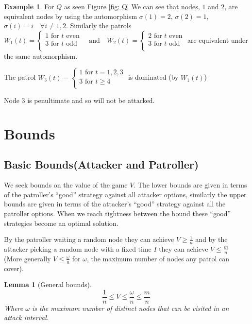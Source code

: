 \documentclass[a4paper,10pt]{article}
\newtheorem{lemma}[theorem]{Lemma}
\theoremstyle{definition}
\theoremstyle{definition}
\newtheorem{example}[theorem]{Example}
\theoremstyle{remark}
\theoremstyle{definition}
\begin{document}
\begin{example}
For $Q$ as seen Figure \ref{fig: Q} We can see that nodes, $1$ and $2$, are equivalent nodes by using the automorphism $\sigma(1)=2$, $\sigma(2)=1$, $\sigma(i)=i \quad \forall i \neq 1,2$. Similarly the patrols ${W_{1}(t)=\left\{\begin{array}{l}
1 \text{ for } t \text{ even} \\
3 \text{ for } t \text{ odd} \\  
\end{array}\right.} \quad \text{and} \quad {W_{2}(t)=\left\{\begin{array}{l}
2 \text{ for } t \text{ even} \\
3 \text{ for } t \text{ odd} \\  
\end{array}\right.}$ are equivalent under the same automorphism.

The patrol ${W_{3}(t)=\left\{\begin{array}{l}
1 \text{ for } t=1,2,3  \\
3 \text{ for } t \geq 4 \\  
\end{array}\right.}$ is dominated (by $W_{1}(t)$)

Node $3$ is penultimate and so will not be attacked.
\end{example}


\section{Bounds}
\subsection{Basic Bounds(Attacker and Patroller)}
We seek bounds on the value of the game $V$. The lower bounds are given in terms of the patroller's ``good'' strategy against all attacker options, similarly the upper bounds are given in terms of the attacker's ``good'' strategy against all the patroller options. When we reach tightness between the bound these ``good'' strategies become an optimal solution.

By the patroller waiting a random node they can achieve $V \geq \frac{1}{n}$ and by the attacker picking a random node with a fixed time $I$ they can achieve $V \leq \frac{m}{n}$ (More generally $V \leq \frac{\omega}{n}$ for $\omega$, the maximum number of nodes any patrol can cover).

\begin{lemma}[General bounds]
$$\frac{1}{n} \leq V \leq \frac{\omega}{n} \leq \frac{m}{n}$$
Where $\omega$ is the maximum number of distinct nodes that can be visited in an attack interval.
\end{lemma}
\end{document}
